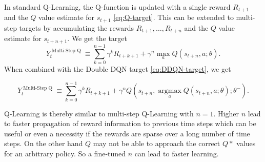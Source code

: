 
In standard Q-Learning, the Q-function is updated with a single reward $R_{t+1}$ and the $Q$ value estimate for $s_{t+1}$ \eqref{eq:Q-target}.
This can be extended to multi-step targets\cite{Sutton1988} by accumulating the rewards $R_{t+1},\dots,R_{t+n}$ and the $Q$ value estimate for $s_{t+n+1}$. We get the target
\begin{equation}
Y_{t}^{\text { Multi-Step Q }} \equiv \sum_{k=0}^{n-1} \gamma^k R_{t+k+1}+\gamma^n \max _{a} Q\left(s_{t+n}, a ; \theta\right).
\end{equation}
When combined with the Double DQN target \eqref{eq:DDQN-target}, we get 

\begin{equation}
Y_{t}^{\text { Multi-Step Q }} \equiv \sum_{k=0}^{n-1} \gamma^k R_{t+k+1}+\gamma^n Q\left(s_{t+n}, \underset{a}{\operatorname{argmax}} Q\left(s_{t+n}, a ; \theta\right); \theta^{-}\right).
\end{equation}

Q-Learning is thereby similar to multi-step Q-Learning with $n=1$. Higher $n$ lead to faster propagation of reward information to previous time steps which can be useful or even a necessity if the rewards are sparse over a long number of time steps. On the other hand $Q$ may not be able to approach the correct $Q*$ values for an arbitrary policy\cite{Peng1996}. So a fine-tuned $n$ can lead to faster learning.
